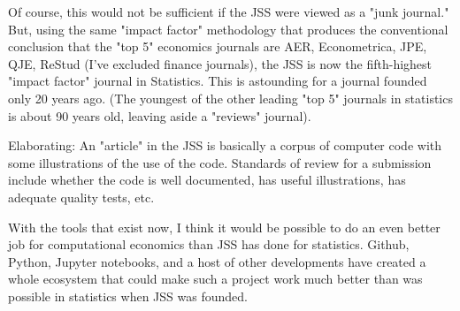 Of course, this would not be sufficient if the JSS were viewed as a "junk journal." But, using the same "impact factor" methodology that produces the conventional conclusion that the "top 5" economics journals are AER, Econometrica, JPE, QJE, ReStud (I've excluded finance journals), the JSS is now the fifth-highest "impact factor" journal in Statistics. This is astounding for a journal founded only 20 years ago. (The youngest of the other leading "top 5" journals in statistics is about 90 years old, leaving aside a "reviews" journal).

Elaborating: An "article" in the JSS is basically a corpus of computer code with some illustrations of the use of the code. Standards of review for a submission include whether the code is well documented, has useful illustrations, has adequate quality tests, etc.

With the tools that exist now, I think it would be possible to do an even better job for computational economics than JSS has done for statistics. Github, Python, Jupyter notebooks, and a host of other developments have created a whole ecosystem that could make such a project work much better than was possible in statistics when JSS was founded.


